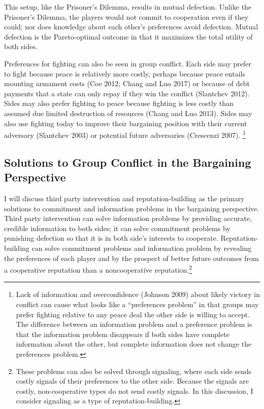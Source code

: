 \documentclass[11pt]{article}
\begin{document}
This setup, like the Prisoner's Dilemma, results in mutual defection.
Unlike the Prisoner's Dilemma, the players would not commit to
cooperation even if they could; nor does knowledge about each other's
preferences avoid defection. Mutual defection is the Pareto-optimal
outcome in that it maximizes the total utility of both sides.

Preferences for fighting can also be seen in group conflict. Each side
may prefer to fight because peace is relatively more costly, perhaps
because peace entails mounting armament costs (Coe 2012; Chang and Luo
2017) or because of debt payments that a state can only repay if they
win the conflict (Slantchev 2012). Sides may also prefer fighting to
peace because fighting is less costly than assumed due limited
destruction of resources (Chang and Luo 2013). Sides may also use
fighting today to improve their bargaining position with their current
adversary (Slantchev 2003) or potential future adversaries (Crescenzi
2007). \footnote{Lack of information and overconfidence (Johnson 2009)
  about likely victory in conflict can cause what looks like a
  ``preferences problem'' in that groups may prefer fighting relative to
  any peace deal the other side is willing to accept. The difference
  between an information problem and a preference problem is that the
  information problem disappears if both sides have complete information
  about the other, but complete information does not change the
  preferences problem.}

\hypertarget{solutions-to-group-conflict-in-the-bargaining-perspective}{%
\subsection{Solutions to Group Conflict in the Bargaining
Perspective}\label{solutions-to-group-conflict-in-the-bargaining-perspective}}

I will discuss third party intervention and reputation-building as the
primary solutions to commitment and information problems in the
bargaining perspective. Third party intervention can solve information
problems by providing accurate, credible information to both sides; it
can solve commitment problems by punishing defection so that it is in
both side's interests to cooperate. Reputation-building can solve
commitment problems and information problem by revealing the preferences
of each player and by the prospect of better future outcomes from a
cooperative reputation than a noncooperative reputation.\footnote{These
  problems can also be solved through signaling, where each side sends
  costly signals of their preferences to the other side. Because the
  signals are costly, non-cooperative types do not send costly signals.
  In this discussion, I consider signaling as a type of
  reputation-building.}
\end{document}
